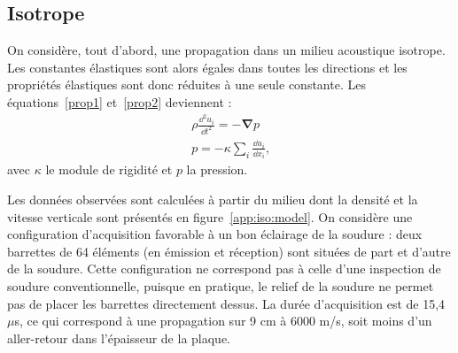 \subsection{Isotrope}
On considère, tout d'abord, une propagation dans un milieu acoustique isotrope. Les constantes élastiques sont alors égales dans toutes les directions et les propriétés élastiques sont donc réduites à une seule constante. Les équations~\ref{prop1} et~\ref{prop2} deviennent : 
\begin{eqnarray}
	\rho \frac{\dd^2 u_{i}}{\dd t^2} = -\bm{\nabla} p\\
	p=-\kappa \displaystyle\sum_{i} \frac{\dd u_{i}}{\dd x_{i}}\text{,}
\end{eqnarray}
avec $\kappa$ le module de rigidité et $p$ la pression.

Les données observées sont calculées à partir du milieu dont la densité et  la vitesse verticale sont présentés en figure~\ref{app:iso:model}. On considère une configuration d'acquisition favorable à un bon éclairage de la soudure : deux barrettes de 64 éléments (en émission et réception) sont situées de part et d'autre de la soudure. Cette configuration ne correspond pas à celle d'une inspection de soudure conventionnelle, puisque en pratique, le relief de la soudure ne permet pas de placer les barrettes directement dessus. La durée d'acquisition est de 15,4 $\mu$s, ce qui correspond à une propagation sur 9 cm à 6000 m/s, soit moins d'un aller-retour dans l'épaisseur de la plaque.\\


